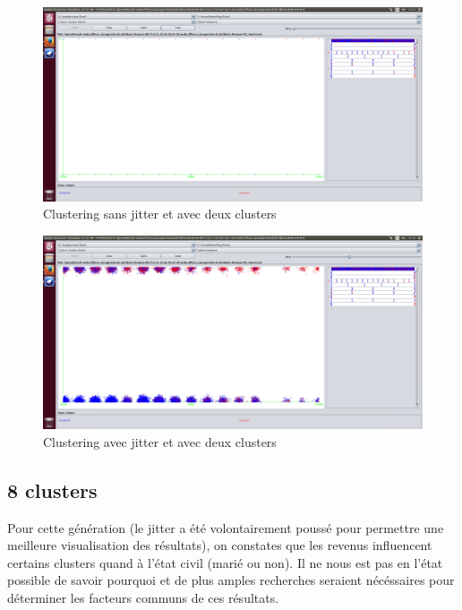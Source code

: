 \begin{figure}[H]
    \centering
    \includegraphics[width=1\linewidth, fbox]{img/clusterSansJitter2.png}
    \caption{Clustering sans jitter et avec deux clusters}
    \label{sansJitter2}
\end{figure}

\begin{figure}[H]
    \centering
    \includegraphics[width=1\linewidth, fbox]{img/clusterAvecJitter2.png}
    \caption{Clustering avec jitter et avec deux clusters}
    \label{sansJitter2}
\end{figure}


\subsection{8 clusters}

Pour cette génération (le jitter a été volontairement poussé pour permettre une meilleure visualisation des résultats), on constates que les revenus influencent certains clusters quand à l'état civil (marié ou non).
Il ne nous est pas en l'état possible de savoir pourquoi et de plus amples recherches seraient nécéssaires pour déterminer les facteurs communs de ces résultats.

